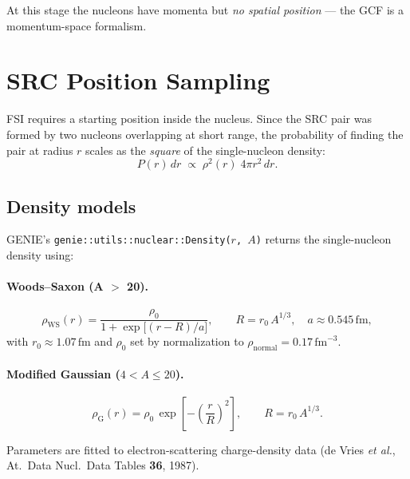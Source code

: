 \documentclass[11pt,a4paper]{article}
\newcommand{\unit}[1]{\,\mathrm{#1}}
\newcommand{\fm}{\unit{fm}}
\begin{document}
At this stage the nucleons have momenta but \emph{no spatial position} ---
the GCF is a momentum-space formalism.

\section{SRC Position Sampling}
\label{sec:position}

FSI requires a starting position inside the nucleus.  Since the SRC pair
was formed by two nucleons overlapping at short range, the probability of
finding the pair at radius $r$ scales as the \emph{square} of the
single-nucleon density:
\begin{equation}\label{eq:pos}
  P(r)\,dr \;\propto\; \rho^{2}(r)\;4\pi r^{2}\,dr.
\end{equation}

\subsection{Density models}

GENIE's \texttt{genie::utils::nuclear::Density($r$,\,$A$)} returns the
single-nucleon density using:

\paragraph{Woods--Saxon (A $>$ 20).}
\begin{equation}
  \rho_{\text{WS}}(r) = \frac{\rho_{0}}{1 + \exp\!\bigl[(r - R)/a\bigr]},
  \qquad
  R = r_{0}\,A^{1/3},\quad a \approx 0.545\fm,
\end{equation}
with $r_{0} \approx 1.07\fm$ and $\rho_{0}$ set by normalization to
$\rho_{\text{normal}} = 0.17\fm^{-3}$.

\paragraph{Modified Gaussian ($4 < A \le 20$).}
\begin{equation}
  \rho_{\text{G}}(r) = \rho_{0}\,
    \exp\!\left[-\left(\frac{r}{R}\right)^{2}\right],
  \qquad R = r_{0}\,A^{1/3}.
\end{equation}

Parameters are fitted to electron-scattering charge-density data
(de Vries \textit{et al.}, At.\ Data Nucl.\ Data Tables \textbf{36}, 1987).
\end{document}
